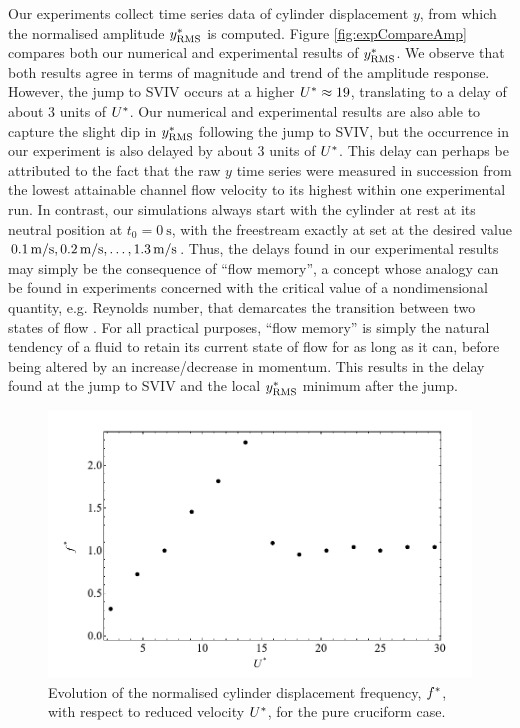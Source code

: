 \documentclass[oneside]{utmthesis}
\begin{document}
Our experiments collect time series data of cylinder displacement $y$, from which the normalised \rms{} amplitude $y^{*}_{\text{RMS}}$ is computed. Figure \ref{fig:expCompareAmp} compares both our numerical and experimental results of $y^{*}_{\text{RMS}}$. We observe that both results agree in terms of magnitude and trend of the amplitude response. However, the jump to SVIV occurs at a higher $U^{*} \approx 19$, translating to a delay of about 3 units of $U^{*}$. Our numerical and experimental results are also able to capture the slight dip in $y^{*}_{\text{RMS}}$ following the jump to SVIV, but the occurrence in our experiment is also delayed by about 3 units of $U^{*}$. This delay can perhaps be attributed to the fact that the raw $y$ time series were measured in succession from the lowest attainable channel flow velocity \uth{} to its highest \uel{} within one experimental run. In contrast, our simulations always start with the cylinder at rest at its neutral position at $t_{0} = \SI{0}{\second}$, with the freestream exactly at set at the desired value $\uon, \utw, \dots, \utt$. Thus, the delays found in our experimental results may simply be the consequence of ``flow memory'', a concept whose analogy can be found in experiments concerned with the critical value of a nondimensional quantity, e.g. Reynolds number, that demarcates the transition between two states of flow \citep{Saint-Michel2014,Rahman2015,Li2021}. For all practical purposes, ``flow memory'' is simply the natural tendency of a fluid to retain its current state of flow for as long as it can, before being altered by an increase/decrease in momentum. This results in the delay found at the jump to SVIV and the local $y^{*}_{\text{RMS}}$ minimum after the jump.

\begin{figure}
  \centering
  \includegraphics[width=1\textwidth]{figs/yStrFreq5}
  \caption{Evolution of the normalised cylinder displacement frequency, $f^{*}$, with respect to reduced velocity $U^{*}$, for the pure cruciform case.}
  \label{fig:yStrFreq5}
\end{figure}
\end{document}
